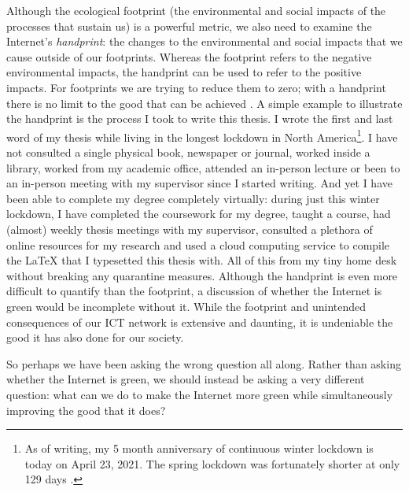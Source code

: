 \documentclass{article}
\begin{document}
Although the ecological footprint (the environmental and social impacts of the processes that sustain us) is a powerful metric, we also need to examine the Internet's \textit{handprint}: the changes to the environmental and social impacts that we cause outside of our footprints. Whereas the footprint refers to the negative environmental impacts, the handprint can be used to refer to the positive impacts. For footprints we are trying to reduce them to zero; with a handprint there is no limit to the good that can be achieved \cite{gronman2019carbon}. A simple example to illustrate the handprint is the process I took to write this thesis. I wrote the first and last word of my thesis while living in the longest lockdown in North America\footnote{As of writing, my 5 month anniversary of continuous winter lockdown is today on April 23, 2021. The spring lockdown was fortunately shorter at only 129 days \cite{cfib2021torontolockdown}.}. I have not consulted a single physical book, newspaper or journal, worked inside a library, worked from my academic office, attended an in-person lecture or been to an in-person meeting with my supervisor since I started writing. And yet I have been able to complete my degree completely virtually: during just this winter lockdown, I have completed the coursework for my degree, taught a course, had (almost) weekly thesis meetings with my supervisor, consulted a plethora of online resources for my research and used a cloud computing service to compile the \LaTeX \; that I typesetted this thesis with. All of this from my tiny home desk without breaking any quarantine measures. Although the handprint is even more difficult to quantify than the footprint, a discussion of whether the Internet is green would be incomplete without it. While the footprint and unintended consequences of our ICT network is extensive and daunting, it is undeniable the good it has also done for our society.

So perhaps we have been asking the wrong question all along. Rather than asking whether the Internet is green, we should instead be asking a very different question: what can we do to make the Internet more green while simultaneously improving the good that it does?


\cleardoublepage


\end{document}
